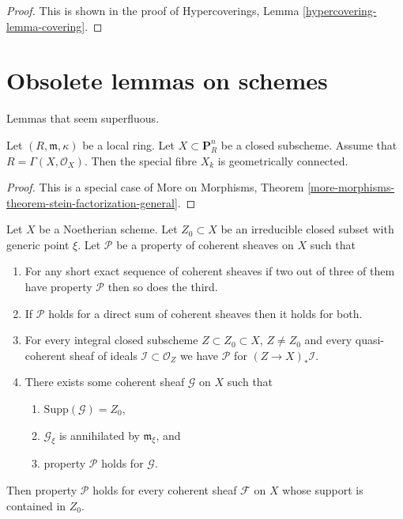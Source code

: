 \begin{proof}
This is shown in the proof of
Hypercoverings, Lemma \ref{hypercovering-lemma-covering}.
\end{proof}




\section{Obsolete lemmas on schemes}
\label{section-devissage}

\noindent
Lemmas that seem superfluous.

\begin{lemma}
\label{lemma-stein-projective}
Let $(R, \mathfrak m, \kappa)$ be a local ring.
Let $X \subset \mathbf{P}^n_R$ be a closed subscheme.
Assume that $R = \Gamma(X, \mathcal{O}_X)$. Then the special fibre
$X_k$ is geometrically connected.
\end{lemma}

\begin{proof}
This is a special case of
More on Morphisms, Theorem
\ref{more-morphisms-theorem-stein-factorization-general}.
\end{proof}

\begin{lemma}
\label{lemma-property-irreducible-higher-rank}
Let $X$ be a Noetherian scheme.
Let $Z_0 \subset X$ be an irreducible closed subset with generic point $\xi$.
Let $\mathcal{P}$ be a property of coherent sheaves on $X$ such that
\begin{enumerate}
\item For any short exact sequence of coherent sheaves if two
out of three of them have property $\mathcal{P}$ then so does the
third.
\item If $\mathcal{P}$ holds for a direct sum of coherent sheaves
then it holds for both.
\item For every integral closed subscheme $Z \subset Z_0 \subset X$,
$Z \not = Z_0$ and every quasi-coherent sheaf of ideals
$\mathcal{I} \subset \mathcal{O}_Z$ we have
$\mathcal{P}$ for $(Z \to X)_*\mathcal{I}$.
\item There exists some coherent sheaf $\mathcal{G}$ on $X$ such that
\begin{enumerate}
\item $\text{Supp}(\mathcal{G}) = Z_0$,
\item $\mathcal{G}_\xi$ is annihilated by $\mathfrak m_\xi$, and
\item property $\mathcal{P}$ holds for $\mathcal{G}$.
\end{enumerate}
\end{enumerate}
Then property $\mathcal{P}$ holds for every coherent sheaf
$\mathcal{F}$ on $X$ whose support is contained in $Z_0$.
\end{lemma}

